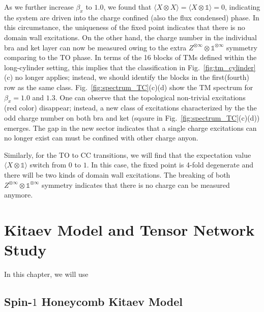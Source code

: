 \documentclass{ntuthesis}
\begin{document}
As we further increase $\beta_x$ to $1.0$, we found that  $\langle X \otimes X  \rangle = \langle X \otimes \mathbb{1}  \rangle = 0$, indicating the system are driven into the charge confined (also the flux condensed) phase. In this circumstance, the uniqueness of the fixed point indicates that there is no domain wall excitations. On the other hand, the charge number in the individual bra and ket layer can now be measured owing to the  extra $Z^{\otimes \infty} \otimes \mathbb{1}^{\otimes \infty}$ symmetry comparing to the TO phase. 
%
In terms of the 16 blocks of TMs defined within the long-cylinder setting, this implies that the classification in Fig.~\ref{fig:tm_cylinder}(c) no longer applies; instead, we should identify the blocks in the first(fourth) row as the same class. 
%
Fig.~\ref{fig:spectrum_TC}(c)(d) show the TM spectrum for $\beta_x = 1.0$ and $1.3$. One can observe that the topological non-trivial excitations (red color) disappear; instead, a new class of excitations characterized by the the odd charge number on both bra and ket (sqaure in Fig.~\ref{fig:spectrum_TC}(c)(d)) emerges. The gap in the new sector indicates that a single charge excitations can no longer exist can must be confined with other charge anyon.

Similarly, for the TO to CC transitions, we will find that the expectation value  $\langle X \otimes \mathbb{1}  \rangle$ switch from $0$ to $1$. In this case, the fixed point is 4-fold degenerate and there will be two kinds of domain wall excitations. The breaking of both $Z^{\otimes \infty} \otimes \mathbb{1}^{\otimes \infty}$ symmetry indicates that there is no charge can be measured anymore.

\chapter{Kitaev Model and Tensor Network Study}

In this chapter, we will use 
\section{Spin-$1$ Honeycomb Kitaev Model}
\end{document}
